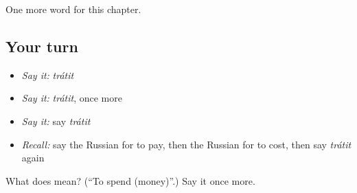 \begin{grammarlens}[title={What you've built}]
One more word for this chapter.
\end{grammarlens}

\subsection*{Your turn}
\begin{itemize}
\raggedright
  \item \emph{Say it:} \emph{trátit}
  \item \emph{Say it:} \emph{trátit}, once more
  \item \emph{Say it:} say \emph{trátit}
  \item \emph{Recall:} say the Russian for to pay, then the Russian for to cost, then say \emph{trátit} again
\end{itemize}

\begin{tcolorbox}[breakable,colback=teal!4,colframe=teal!35!black,title={Before you move on}]
What does  mean? (\textquotedblleft{}To spend (money)\textquotedblright{}.) Say it once more.
\end{tcolorbox}
